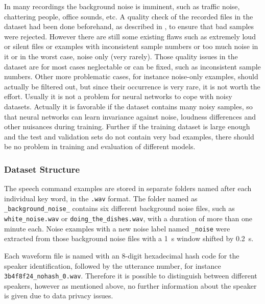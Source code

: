 In many recordings the background noise is imminent, such as traffic noise, chattering people, office sounds, etc.
A quality check of the recorded files in the dataset had been done beforehand, as described in \cite{Warden2018}, to ensure that bad samples were rejected.
However there are still some existing flaws such as extremely loud or silent files or examples with inconsistent sample numbers or too much noise in it or in the worst case, noise only (very rarely).
Those quality issues in the dataset are for most cases neglectable or can be fixed, such as inconsistent sample numbers. 
Other more problematic cases, for instance noise-only examples, should actually be filtered out, but since their occurrence is very rare, it is not worth the effort.
Usually it is not a problem for neural networks to cope with noisy datasets. 
Actually it is favorable if the dataset contains many noisy samples, so that neural networks can learn invariance against noise, loudness differences and other nuisances during training.
Further if the training dataset is large enough and the test and validation sets do not contain very bad examples, there should be no problem in training and evaluation of different models.



\subsubsection{Dataset Structure}
The speech command examples are stored in separate folders named after each individual key word, in the \texttt{.wav} format.
The folder named as \texttt{\_background\_noise\_} contains six different background noise files, such as \texttt{white\_noise.wav} or \texttt{doing\_the\_dishes.wav}, with a duration of more than one minute each.
Noise examples with a new noise label named \texttt{\_noise} were extracted from those background noise files with a \SI{1}{\second} window shifted by \SI{0.2}{\second}.

Each waveform file is named with an 8-digit hexadecimal hash code for the speaker identification, followed by the utterance number, for instance \texttt{3b4f8f24\_nohash\_0.wav}.
Therefore it is possible to distinguish between different speakers, however as mentioned above, no further information about the speaker is given due to data privacy issues.

